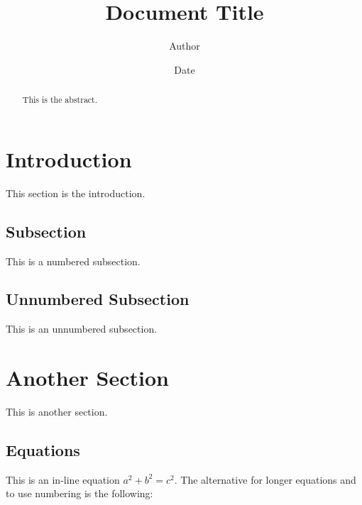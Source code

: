 \documentclass[a4paper,12pt]{article}
\begin{document}
\title{Document Title}
\author{Author}
\date{Date}
\maketitle


\tableofcontents
\listoffigures
\listoftables
\newpage

\begin{abstract}
This is the abstract.
\end{abstract}

\section{Introduction}\label{sec:intro}
This section is the introduction.
\subsection{Subsection}
This is a numbered subsection.
\subsection*{Unnumbered Subsection}
This is an unnumbered subsection.

\section{Another Section}
This is another section.

\subsection{Equations}
This is an in-line equation $a^{2}+b^{2}=c^{2}$. The alternative for longer equations and to use numbering is the following:
\end{document}
